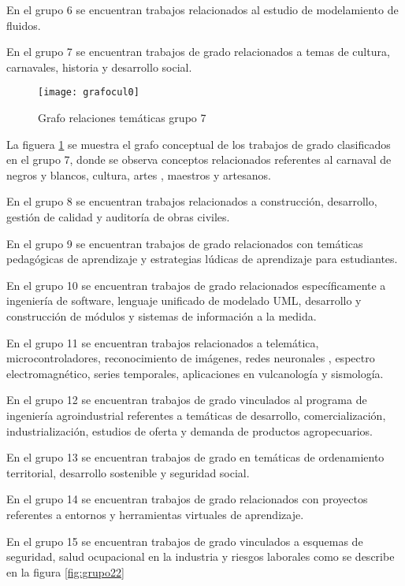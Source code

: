 En el grupo 6 se encuentran trabajos relacionados al estudio de modelamiento de fluidos.

En el grupo 7 se encuentran trabajos de grado relacionados a temas de cultura, carnavales, historia y desarrollo social.
\begin{figure}[H]\centering
\texttt{[image: grafocul0]}
\caption{Grafo  relaciones temáticas grupo 7 }
\label{fig:grafoculcero}
\end{figure}



La figuera \ref{fig:grafoculcero}  se muestra el grafo  conceptual  de los trabajos de grado clasificados en el grupo 7, donde se observa conceptos relacionados referentes al carnaval de negros y blancos, cultura, artes , maestros y artesanos.

En el grupo 8 se encuentran trabajos relacionados a construcción, desarrollo, gestión de calidad y auditoría de obras civiles.

En el grupo 9 se encuentran trabajos de grado relacionados con temáticas pedagógicas de aprendizaje   y estrategias lúdicas de aprendizaje  para estudiantes.

En el grupo 10 se encuentran trabajos de grado relacionados específicamente a ingeniería de software, lenguaje unificado de modelado UML, desarrollo y construcción de módulos y sistemas de información a la medida.

En el grupo 11 se encuentran trabajos relacionados a telemática, microcontroladores, reconocimiento de imágenes, redes neuronales ,  espectro electromagnético,  series temporales,  aplicaciones en vulcanología y sismología. 

En el grupo 12 se encuentran trabajos de grado vinculados al programa de ingeniería agroindustrial referentes a temáticas de desarrollo, comercialización, industrialización, estudios de oferta y demanda de productos agropecuarios.

En el grupo 13 se encuentran trabajos de grado en temáticas de ordenamiento territorial, desarrollo sostenible y seguridad social.  %

En el grupo 14 se encuentran trabajos de grado relacionados con proyectos referentes a entornos y herramientas virtuales de aprendizaje.

En el grupo 15 se encuentran trabajos de grado vinculados a esquemas de seguridad, salud ocupacional en la industria y riesgos laborales como se describe en la figura \ref{fig:grupo22}


